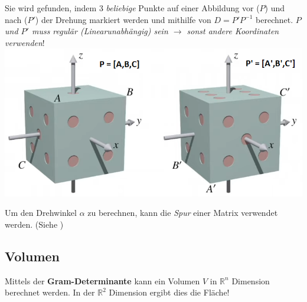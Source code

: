 \noindent
Sie wird gefunden, indem 3 \textit{beliebige} Punkte auf einer Abbildung vor ($P$) und nach ($P'$) der Drehung markiert werden und mithilfe von $D = P'P^{-1}$ berechnet. \textit{$P$ und $P'$ muss regulär (Linearunabhängig) sein $\rightarrow$ sonst andere Koordinaten verwenden}!
\includegraphics[width=\columnwidth]{./Images/Drehmatrix.png}

\noindent
Um den Drehwinkel $\alpha$ zu berechnen, kann die \textit{Spur} einer Matrix verwendet werden. (Siehe )

\subsection{Volumen}\label{gram-determinante}
Mittels der \textbf{Gram-Determinante} kann ein Volumen $V$ in $\mathbb{R}^n$ Dimension berechnet werden. In der $\mathbb{R}^2$ Dimension ergibt dies die Fläche!

